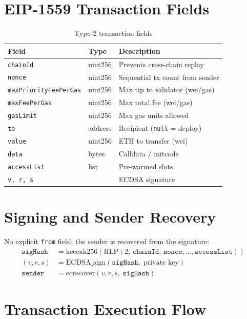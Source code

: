 \documentclass[12pt,a4paper,openany]{book}
\theoremstyle{definition}
\theoremstyle{plain}
\theoremstyle{remark}
\begin{document}
\section{EIP-1559 Transaction Fields}

\begin{table}[h]
\centering
\caption{Type-2 transaction fields}
\begin{tabular}{lll}
\toprule
\textbf{Field} & \textbf{Type} & \textbf{Description} \\
\midrule
\texttt{chainId}              & uint256 & Prevents cross-chain replay \\
\texttt{nonce}                & uint256 & Sequential tx count from sender \\
\texttt{maxPriorityFeePerGas} & uint256 & Max tip to validator (wei/gas) \\
\texttt{maxFeePerGas}         & uint256 & Max total fee (wei/gas) \\
\texttt{gasLimit}             & uint256 & Max gas units allowed \\
\texttt{to}                   & address & Recipient (\texttt{null} = deploy) \\
\texttt{value}                & uint256 & ETH to transfer (wei) \\
\texttt{data}                 & bytes   & Calldata / initcode \\
\texttt{accessList}           & list    & Pre-warmed slots \\
\texttt{v, r, s}              &         & ECDSA signature \\
\bottomrule
\end{tabular}
\end{table}

\section{Signing and Sender Recovery}

No explicit \texttt{from} field; the sender is recovered from the signature:
\begin{align}
  \texttt{sigHash} &= \mathrm{keccak256}(\mathrm{RLP}(2,\,\texttt{chainId},\,\texttt{nonce},\ldots,\texttt{accessList})) \\
  (v,r,s) &= \mathrm{ECDSA\_sign}(\texttt{sigHash},\;\text{private key}) \\
  \texttt{sender} &= \mathrm{ecrecover}(v,r,s,\;\texttt{sigHash})
\end{align}

\section{Transaction Execution Flow}
\end{document}
